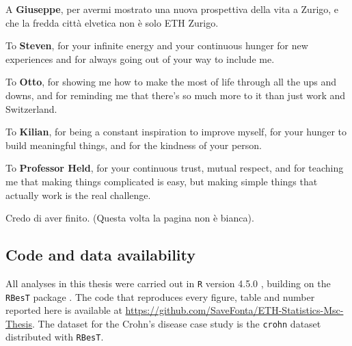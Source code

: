 {A \textbf{Giuseppe}, per avermi mostrato una nuova prospettiva della vita a Zurigo, e che la fredda città elvetica non è solo ETH Zurigo.

To \textbf{Steven}, for your infinite energy and your continuous hunger for new experiences and for always going out of your way to include me.

To \textbf{Otto}, for showing me how to make the most of life through all the ups and downs, and for reminding me that there’s so much more to it than just work and Switzerland.

To \textbf{Kilian}, for being a constant inspiration to improve myself, for your hunger to build meaningful things, and for the kindness of your person.

To \textbf{Professor Held}, for your continuous trust, mutual respect, and for teaching me that making things complicated is easy, but making simple things that actually work is the real challenge.

\vspace{3em}

Credo di aver finito. (Questa volta la pagina non è bianca).

}




\newpage
\subsection*{Code and data availability}
All analyses in this thesis were carried out in \texttt{R} version 4.5.0 \citep{rcore2025}, building on the \texttt{RBesT} package \citep{weber_applying_2021}. The code that reproduces every figure, table and number reported here is available at \url{https://github.com/SaveFonta/ETH-Statistics-Msc-Thesis}. The dataset for the Crohn's disease case study is the \texttt{crohn} dataset distributed with \texttt{RBesT}.

